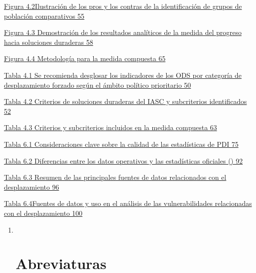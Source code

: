 \documentclass[
]{book}
\begin{document}
\protect\hyperlink{_Toc70629921}{Figura 4.2Ilustración de los pros y los contras de la identificación de grupos de población comparativos 55}

\href{/C:\%5CUsers\%5CMariana\%5CDocuments\%5C04-TRABAJO\%5CACNUR\%5CTraducciones\%5C04_Abril_2021\%5CACNUR\%2020210422-1\%5CIRIS\%202020.3486_src_EN_revised_140820_ESP_REV_mfa.docx\#_Toc70629922}{Figura 4.3 Demostración de los resultados analíticos de la medida del progreso hacia soluciones duraderas 58}

\protect\hyperlink{_Toc70629923}{Figura 4.4 Metodología para la medida compuesta 65}

\protect\hyperlink{_Toc70629924}{Tabla 4.1 Se recomienda desglosar los indicadores de los ODS por categoría de desplazamiento forzado según el ámbito político prioritario 50}

\protect\hyperlink{_Toc70629925}{Tabla 4.2 Criterios de soluciones duraderas del IASC y subcriterios identificados 52}

\protect\hyperlink{_Toc70629926}{Tabla 4.3 Criterios y subcriterios incluidos en la medida compuesta 63}

\protect\hyperlink{_Toc70629927}{Tabla 6.1 Consideraciones clave sobre la calidad de las estadísticas de PDI 75}

\protect\hyperlink{_Toc70629928}{Tabla 6.2 Diferencias entre los datos operativos y las estadísticas oficiales () 92}

\protect\hyperlink{_Toc70629929}{Tabla 6.3 Resumen de las principales fuentes de datos relacionados con el desplazamiento 96}

\protect\hyperlink{_Toc70629930}{Tabla 6.4Fuentes de datos y uso en el análisis de las vulnerabilidades relacionadas con el desplazamiento 100}

\begin{enumerate}
\def\labelenumi{\arabic{enumi}.}
\item ~
  \hypertarget{abreviaturas}{%
  \section{Abreviaturas}\label{abreviaturas}}
\end{enumerate}
\end{document}
